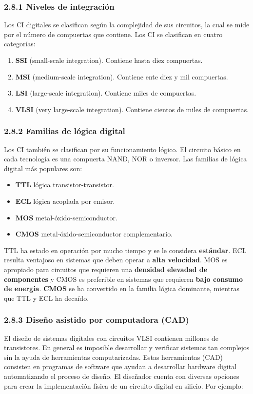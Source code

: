 \documentclass{article}
\begin{document}
\subsubsection*{2.8.1 Niveles de integraci\'{o}n}
Los CI digitales se clasifican seg\'{u}n la complejidad de sus circuitos, la cual se mide por
el n\'{u}mero de compuertas que contiene. Los CI se clasifican en cuatro categor\'{i}as:

\begin{enumerate}
    \item \textbf{SSI} (small-scale integration). Contiene hasta diez compuertas.
    \item \textbf{MSI} (medium-scale integration). Contiene ente diez y mil compuertas.
    \item \textbf{LSI} (large-scale integration). Contiene miles de compuertas.
    \item \textbf{VLSI} (very large-scale integration). Contiene cientos de miles de compuertas.
\end{enumerate}

\subsubsection*{2.8.2 Familias de l\'{o}gica digital}
Los CI tambi\'{e}n se clasifican por su funcionamiento l\'{o}gico. El circuito b\'{a}sico en
cada tecnolog\'{i}a es una compuerta NAND, NOR o inversor. Las familias de l\'{o}gica digital
m\'{a}s populares son:

\begin{itemize}
    \item \textbf{TTL} l\'{o}gica transistor-transistor.
    \item \textbf{ECL} l\'{o}gica acoplada por emisor.
    \item \textbf{MOS} metal-\'{o}xido-semiconductor.
    \item \textbf{CMOS} metal-\'{o}xido-semiconductor complementario.
\end{itemize}

TTL ha estado en operaci\'{o}n por mucho tiempo y se le considera \textbf{est\'{a}ndar}. ECL resulta
ventajoso en sistemas que deben operar a \textbf{alta velocidad}. MOS es apropiado para circuitos que
requieren una \textbf{densidad elevadad de componentes} y CMOS es preferible en sistemas que
requieren \textbf{bajo consumo de energ\'{i}a}. \textbf{CMOS} se ha convertido en la familia l\'{o}gica
dominante, mientras que TTL y ECL ha deca\'{i}do.

\subsubsection*{2.8.3 Dise\~{n}o asistido por computadora (CAD)}
El dise\~{n}o de sistemas digitales con circuitos VLSI contienen millones de transistores. En general
es imposible desarrollar y verificar sistemas tan complejos sin la ayuda de herramientas computarizadas.
Estas herramientas (CAD) consisten en programas de software que ayudan a desarrollar hardware digital 
automatizando el proceso de dise\~{n}o. El dise\~{n}ador cuenta con diversas opciones para crear la 
implementaci\'{o}n f\'{i}sica de un circuito digital en silicio. Por ejemplo:
\end{document}
